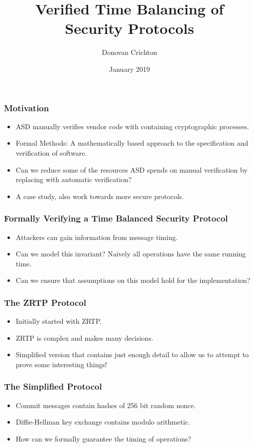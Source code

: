\documentclass{beamer}
\title{Verified Time Balancing of Security Protocols}
\author{Donovan Crichton}
\date{January 2019}
\begin{document}
 
\frame{\titlepage}

\begin{frame}[fragile]
  \frametitle{Motivation}
  \begin{itemize}
    \item ASD manually verifies vendor code with containing 
          cryptographic processes.
    \item Formal Methods: A mathematically based approach to the
            specification and verification of software.
    \item Can we reduce some of the resources ASD spends on 
            manual verification by replacing with automatic 
            verification?
    \item A case study, also work towards more secure protocols.
  \end{itemize}
\end{frame}

\begin{frame}[fragile]
  \frametitle{Formally Verifying a Time Balanced Security Protocol}
  \begin{itemize}
    \item Attackers can gain information from message timing.
    \item Can we model this invariant? Naively all operations 
          have the same running time.
    \item Can we ensure that assumptions on this model hold for the
            implementation?
  \end{itemize}
\end{frame}

\begin{frame}[fragile]
  \frametitle{The ZRTP Protocol}
  \begin{itemize}
    \item Initially started with ZRTP.
    \item ZRTP is complex and makes many decisions.
    \item Simplified version that contains just enough detail to 
            allow us to attempt to prove some interesting things!
  \end{itemize}
\end{frame}

\begin{frame}[fragile]
  \frametitle{The Simplified Protocol}
    \begin{itemize}
      \item Commit messages contain hashes of 256 bit random nonce.
      \item Diffie-Hellman key exchange contains modulo arithmetic.
      \item How can we formally guarantee the timing of operations?
    \end{itemize}
\end{frame}
\end{document}
